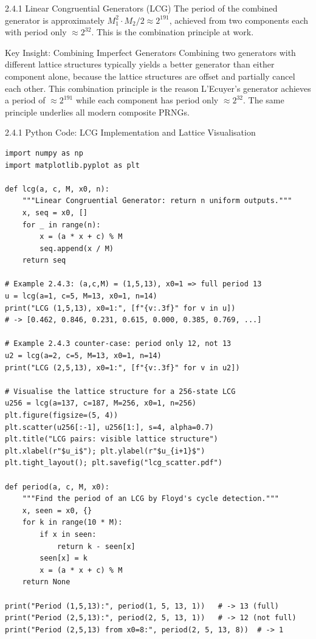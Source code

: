 \documentclass[aspectratio=169,10pt]{beamer}
\begin{document}
\begin{frame}[allowframebreaks]{2.4.1 Linear Congruential Generators (LCG)}
The period of the combined generator is approximately
$M_1^2 \cdot M_2 / 2 \approx 2^{191}$, achieved from two components each
with period only $\approx 2^{32}$.  This is the combination principle at work.

\begin{alertblock}{Key Insight: Combining Imperfect Generators}
Combining two generators with different lattice structures typically yields
a better generator than either component alone, because the lattice
structures are offset and partially cancel each other.  This combination
principle is the reason L'Ecuyer's generator achieves a period of
$\approx 2^{191}$ while each component has period only $\approx 2^{32}$.
The same principle underlies all modern composite PRNGs.
\end{alertblock}

\end{frame}

\begin{frame}[fragile]{2.4.1 Python Code: LCG Implementation and Lattice Visualisation}

\begin{lstlisting}[style=python]
import numpy as np
import matplotlib.pyplot as plt

def lcg(a, c, M, x0, n):
    """Linear Congruential Generator: return n uniform outputs."""
    x, seq = x0, []
    for _ in range(n):
        x = (a * x + c) % M
        seq.append(x / M)
    return seq

# Example 2.4.3: (a,c,M) = (1,5,13), x0=1 => full period 13
u = lcg(a=1, c=5, M=13, x0=1, n=14)
print("LCG (1,5,13), x0=1:", [f"{v:.3f}" for v in u])
# -> [0.462, 0.846, 0.231, 0.615, 0.000, 0.385, 0.769, ...]

# Example 2.4.3 counter-case: period only 12, not 13
u2 = lcg(a=2, c=5, M=13, x0=1, n=14)
print("LCG (2,5,13), x0=1:", [f"{v:.3f}" for v in u2])

# Visualise the lattice structure for a 256-state LCG
u256 = lcg(a=137, c=187, M=256, x0=1, n=256)
plt.figure(figsize=(5, 4))
plt.scatter(u256[:-1], u256[1:], s=4, alpha=0.7)
plt.title("LCG pairs: visible lattice structure")
plt.xlabel(r"$u_i$"); plt.ylabel(r"$u_{i+1}$")
plt.tight_layout(); plt.savefig("lcg_scatter.pdf")

def period(a, c, M, x0):
    """Find the period of an LCG by Floyd's cycle detection."""
    x, seen = x0, {}
    for k in range(10 * M):
        if x in seen:
            return k - seen[x]
        seen[x] = k
        x = (a * x + c) % M
    return None

print("Period (1,5,13):", period(1, 5, 13, 1))   # -> 13 (full)
print("Period (2,5,13):", period(2, 5, 13, 1))   # -> 12 (not full)
print("Period (2,5,13) from x0=8:", period(2, 5, 13, 8))  # -> 1
\end{lstlisting}

\end{frame}
\end{document}
